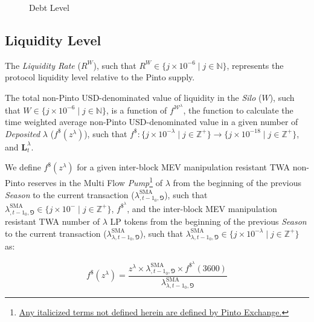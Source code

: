 \documentclass[tikz]{article}
\newcommand{\term}[1]{\textsl{#1}}
\newcommand{\fref}[1]{\footnote{\href{http://#1}{#1}}}
\newcommand{\nonpinto}{} %
\begin{document}
\begin{figure}[h!]
    \centering
    
    \vspace*{-7mm}
    \setlength{\belowcaptionskip}{-8pt} %
    \caption{Debt Level}
    \label{Debt Level}
\end{figure}


\subsection{Liquidity Level}

The \term{Liquidity Rate} ($R^{W}$), such that $R^{W} \in \{j \times 10^{-6} \mid j \in \mathbb{N} \}$, represents the protocol liquidity level relative to the Pinto supply.

The total non-Pinto USD-denominated value of liquidity in the \term{Silo} ($W$), such that $W \in \{j \times 10^{-6} \mid j \in \mathbb{N} \}$, is a function of $f^{\mathscr{W}^{\lambda}}$, the function to calculate the time weighted average non-Pinto USD-denominated value in a given number of \term{Deposited} $\lambda$ ($f^{\$}(z^{\lambda})$), such that $f^{\$}\colon \{j \times 10^{-\lambda} \mid j \in \mathbb{Z}^{+} \} \rightarrow \{j \times 10^{-18} \mid j \in \mathbb{Z}^{+} \}$, and $\mathbf{L}_{t}^{\lambda}$.

We define $f^{\$}(z^{\lambda})$ for a given inter-block MEV manipulation resistant TWA non-Pinto reserves in the Multi Flow \term{Pump}\fref{Any italicized terms not defined herein are defined by Pinto Exchange.} of $\lambda$ from the beginning of the previous \term{Season} to the current transaction ($\lambda_{\nonpinto,{t-1}_0,\Game}^{\text{SMA}}$), such that $\lambda_{\nonpinto,{t-1}_0,\Game}^{\text{SMA}} \in \{j \times 10^{-\nonpinto} \mid j \in \mathbb{Z}^{+} \}$, $f^{\$^{\lambda}}$, and the inter-block MEV manipulation resistant TWA number of $\lambda$ LP tokens from the beginning of the previous \term{Season} to the current transaction ($\lambda_{\lambda,{t-1}_0,\Game}^{\text{SMA}}$), such that $\lambda_{\lambda,{t-1}_0,\Game}^{\text{SMA}} \in \{j \times 10^{-\lambda} \mid j \in \mathbb{Z}^{+} \}$ as:

    $$
        f^{\$}(z^{\lambda}) = \frac{z^{\lambda} \times 
                                    \lambda_{\nonpinto,{t-1}_0,\Game}^{\text{SMA}} \times 
                                    f^{\$^{\lambda}}(3600)}
                                {\lambda_{\lambda,{t-1}_0,\Game}^{\text{SMA}}}
    $$
\end{document}

